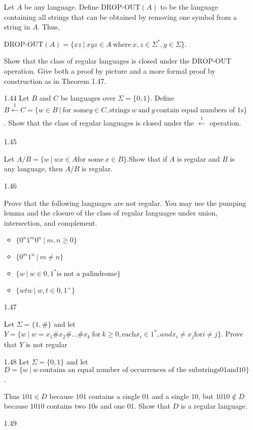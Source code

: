 \begin{enumerate}
            Let $A$ be any language. Define $\text{DROP-OUT}(A)$ to be the language containing all strings that can be obtained by removing one symbol from a string in $A$. Thus,

            $\text{DROP-OUT}(A)=\{xz ~|~ xyz \in A~ \text{where}~ x,z \in \Sigma^\ast,y \in \Sigma\}$.

            Show that the class of regular languages is closed under the $\text{DROP-OUT}$ operation. Give both a proof by picture and a more formal proof by construction as in Theorem 1.47.




      \item [1.44]
      Let $B$ and $C$ be languages over $\Sigma = \{0,1\}$. Define $B \xleftarrow[]{1} C = \{w \in B~| ~\text{for some} y \in C, \text{strings}~ w~ \text{and}~ y~ \text{contain equal numbers of }1\text{s}\}$. Show that the class of regular languages is closed under the $\xleftarrow[]{1}$ operation.   

      \item [1.45]

      Let $A/B = \{w~|~wx \in A \text{for some}~ x \in B\}$.Show that if $A$ is regular and $B$ is any language, then $A/B$ is regular.
      \item [1.46]
      
      Prove that the following languages are not regular. You may use the pumping lemma and the closure of the class of regular languages under union, intersection, and complement. 

    \begin{itemize}

      \item $\{0^n1^m0^n ~|~ m,n \ge 0\}$ 

      \item $\{0^m1^n~ |~ m \ne n\} $

      \item $\{w~|~w \in {0,1}^\ast \text{is not a palindrome}\}$

      \item $\{wtw~|~w,t \in{0,1}^+\}$

    \end{itemize}
      \item [1.47]
      
      Let $\Sigma = \{1,\#\}$ and let $Y =\{w~|~w = x_1\#x_2\#\ldots \#x_k~ \text{for}~ k \ge 0, \text{each} x_i \in 1^\ast, and x_i \ne x_j \text{for} i \ne j\}$. Prove that $Y$ is not regular
      \item [1.48]
      Let $\Sigma=\{0,1\}$ and let $D=\{w~|~w ~\text{contains an equal number of occurrences of the substrings} 01 \text{and} 10\}$. 
            
            Thus $101 \in D$ because $101$ contains a single $01$ and a single $10$, but $1010 \notin D$
            because $1010$ contains two $10$s and one $01$. Show that $D$ is a regular language.
      \item [1.49]

\end{enumerate}
